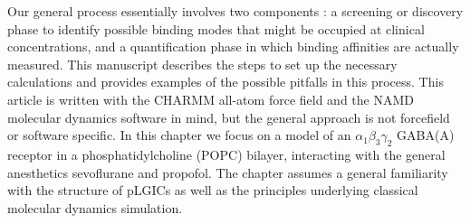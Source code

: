 \documentclass[12pt]{article}
\begin{document}
Our general process essentially involves two components : a screening or discovery phase to identify possible binding modes that might be occupied at clinical concentrations, and a quantification phase in which binding affinities are actually measured.  This manuscript describes the steps to set up the necessary calculations and provides examples of the possible pitfalls in this process.  This article is written with the CHARMM all-atom force field \cite{Brooks2009} and the NAMD molecular dynamics software \cite{Phillips2005a}in mind, but the general approach is not forcefield or software specific.  In this chapter we focus on a model of an $\alpha_1\beta_{3}\gamma_{2}$ GABA(A) receptor in a phosphatidylcholine (POPC) bilayer, interacting with the general anesthetics sevoflurane and propofol.  The chapter assumes a general familiarity with the structure of pLGICs as well as the principles underlying classical molecular dynamics simulation.  

\end{document}
